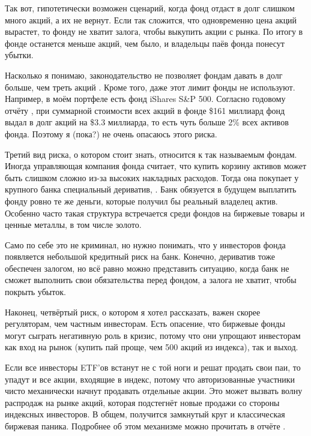 Так вот, гипотетически возможен сценарий, когда фонд отдаст в долг слишком много акций, а их не вернут. Если так сложится, что одновременно цена акций вырастет, то фонду не хватит залога, чтобы выкупить акции с рынка. По итогу в фонде останется меньше акций, чем было, и владельцы паёв фонда понесут убытки.

Насколько я понимаю, законодательство не позволяет фондам давать в долг больше, чем треть акций \cite{wsj2011lending}. Кроме того, даже этот лимит фонды не используют. Например, в моём портфеле есть фонд iShares S\&P 500. Согласно годовому отчёту \cite{ishares2020report}, при суммарной стоимости всех акций в фонде \$161 миллиард фонд выдал в долг акций на \$3.3 миллиарда, то есть чуть больше 2\% всех активов фонда. Поэтому я (пока?) не очень опасаюсь этого риска.

Третий вид риска, о котором стоит знать, относится к так называемым  фондам. Иногда управляющая компания фонда считает, что купить корзину активов может быть слишком сложно из-за высоких накладных расходов. Тогда она покупает у крупного банка специальный дериватив, . Банк обязуется в будущем выплатить фонду ровно те же деньги, которые получил бы реальный владелец актив. Особенно часто такая структура встречается среди фондов на биржевые товары и ценные металлы, в том числе золото.

Само по себе это не криминал, но нужно понимать, что у инвесторов фонда появляется небольшой кредитный риск на банк. Конечно, дериватив тоже обеспечен залогом, но всё равно можно представить ситуацию, когда банк не сможет выполнить свои обязательства перед фондом, а залога не хватит, чтобы покрыть убыток.

Наконец, четвёртый риск, о котором я хотел рассказать, важен скорее регуляторам, чем частным инвесторам. Есть опасение, что биржевые фонды могут сыграть негативную роль в кризис, потому что они упрощают инвесторам как вход на рынок (купить пай проще, чем 500 акций из индекса), так и выход.

Если все инвесторы ETF'ов встанут не с той ноги и решат продать свои паи, то упадут и все акции, входящие в индекс, потому что авторизованные участники чисто механически начнут продавать отдельные акции. Это может вызвать волну распродаж на рынке акций, которая подстегнёт новые продажи со стороны индексных инвесторов. В общем, получится замкнутый круг и классическая биржевая паника. Подробнее об этом механизме можно прочитать в отчёте \cite{pagano2019can}.

